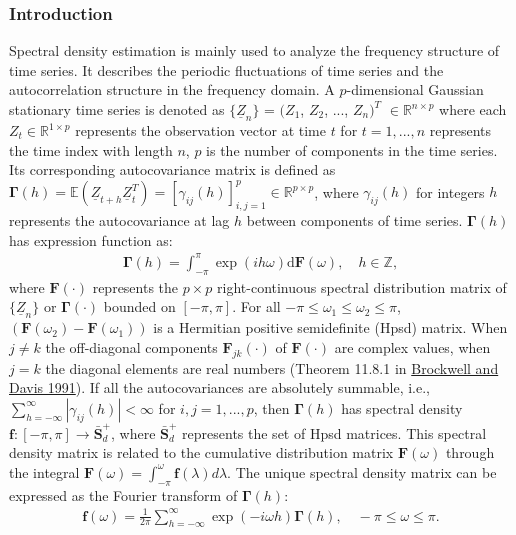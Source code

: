 \documentclass[12pt,a4paper]{article}
\begin{document}
\subsubsection{Introduction}
Spectral density estimation is mainly used to analyze the frequency structure of time series. It describes the periodic fluctuations of time series and the autocorrelation structure in the frequency domain. A $p$-dimensional Gaussian stationary time series is denoted as $\{\underline Z_{n}\}$ = $(Z_{1}$, $Z_{2}$, ..., $Z_{n})^T$ $\in \mathbb{R}^{n\times p}$ where each $Z_{t}\in \mathbb{R}^{1\times p}$ represents the observation vector at time $t$ for $t=1,...,n$ represents the time index with length $n$, $p$ is the number of components in the time series. Its corresponding autocovariance matrix is defined as $\mathbf{\Gamma}(h)=\mathbb{E}(\underline{Z}_{t+h} \underline{Z}_{t}^T)=[\gamma_{ij}(h)]_{i,j=1}^p \in \mathbb{R}^{p\times p}$, where $\gamma_{ij}(h)$ for integers $h$ represents the autocovariance at lag $h$ between components of time series. $\mathbf{\Gamma}(h)$ has expression function as:
\begin{align*}
\mathbf{\Gamma}(h) = \int_{-\pi}^{\pi} \exp(i h\omega)\mathrm{d}\bm{F}(\omega), \quad h \in \mathbb{Z},
\end{align*}
where $\bm{F}(\cdot)$ represents the $p \times p$ right-continuous spectral distribution matrix of $\{\underline Z_n\}$ or $\mathbf{\Gamma}(\cdot)$ bounded on $[-\pi, \pi]$. For all $-\pi \leq \omega_1 \leq\omega_2 \leq\pi$, $(\bm{F}(\omega_2) - \bm{F}(\omega_1))$ is a Hermitian positive semidefinite (Hpsd) matrix. When $j \neq k$ the off-diagonal components $\bm{F}_{jk}(\cdot)$ of $\bm{F}(\cdot)$ are complex values, when $j = k$ the diagonal elements are real numbers (Theorem 11.8.1 in \hyperref[BD1991]{Brockwell and Davis 1991}). If all the autocovariances are  absolutely summable, i.e., $\sum_{h=-\infty}^{\infty}|\gamma_{ij}(h)|< \infty$ for $i, j=1, ..., p$, then $\mathbf{\Gamma}(h)$ has spectral density $\bm{f}: [-\pi, \pi] \rightarrow \bar{\bm S}_d^+$, where $\bar{\bm S}_d^+$ represents the set of Hpsd matrices. This spectral density matrix is related to the cumulative distribution matrix $\bm{F}(\omega)$ through the integral $\bm{F}(\omega) = \int_{-\pi}^{\omega}\bm{f}(\lambda) d\lambda$. The unique spectral density matrix can be expressed as the Fourier transform of $\mathbf{\Gamma}(h)$:
\begin{align*}
\bm{f}(\omega) = \frac{1}{2\pi}\sum_{h=-\infty}^{\infty} \exp(-i\omega h) \mathbf{\Gamma}(h), \quad -\pi \leq \omega\leq\pi.
\end{align*}
\end{document}
